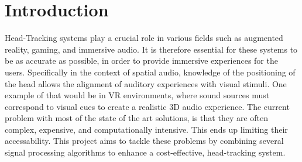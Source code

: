 \chapter{Introduction}
Head-Tracking systems play a crucial role in various fields such as augmented reality, gaming, and immersive audio. It is therefore essential for these systems to be as accurate as possible, in order to provide immersive experiences for the users. Specifically in the context of spatial audio, knowledge of the positioning of the head allows the alignment of auditory experiences with visual stimuli. One example of that would be in VR environments, where sound sources must correspond to visual cues to create a realistic 3D audio experience. The current problem with most of the state of the art solutions, is that they are often complex, expensive, and computationally intensive. This ends up limiting their accessability.  This project aims to tackle these problems by combining several signal processing algorithms to enhance a cost-effective, head-tracking system.